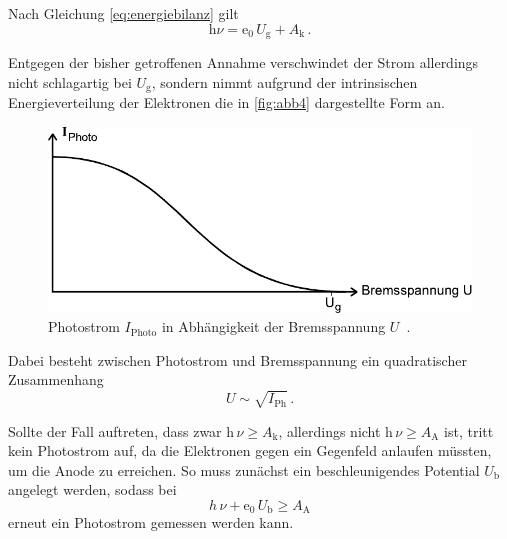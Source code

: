 
Nach Gleichung \eqref{eq:energiebilanz} gilt
\begin{equation*}
    \text{h} \nu = \text{e}_0 \,U_\text{g} + A_\text{k} \,.
\end{equation*}

Entgegen der bisher getroffenen Annahme verschwindet der Strom allerdings nicht schlagartig bei $U_\text{g}$, sondern nimmt aufgrund der intrinsischen Energieverteilung der Elektronen die in \autoref{fig:abb4}
dargestellte Form an.

\begin{figure}[H]
    \centering
    \includegraphics{figures/Abb4.pdf}
    \caption{Photostrom $I_\text{Photo}$ in Abhängigkeit der Bremsspannung $U$ \,\cite{ap10}.}
    \label{fig:abb4}
\end{figure}

Dabei besteht zwischen Photostrom und Bremsspannung ein quadratischer Zusammenhang
\begin{equation*}
    U \sim \sqrt{I_\text{Ph}} \,.
\end{equation*}

Sollte der Fall auftreten, dass zwar $\text{h} \, \nu \geq A_\text{k}$, allerdings nicht $\text{h} \, \nu \geq A_\text{A}$ ist, tritt kein Photostrom auf, da die Elektronen gegen ein Gegenfeld anlaufen müssten,
um die Anode zu erreichen.
So muss zunächst ein beschleunigendes Potential $U_\text{b}$ angelegt werden, sodass bei
\begin{equation*}
    h \, \nu + \text{e}_0 \, U_\text{b} \geq A_\text{A}
\end{equation*}
erneut ein Photostrom gemessen werden kann.

